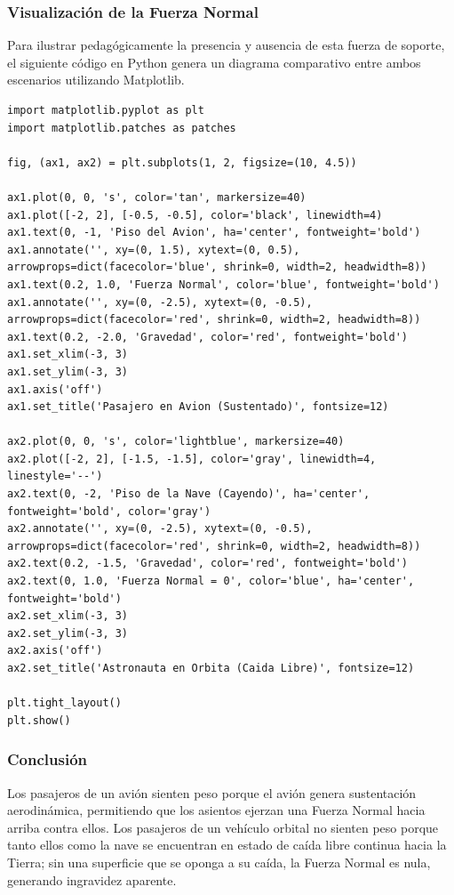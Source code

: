 \documentclass[12pt]{article}
\begin{document}
\subsubsection*{Visualización de la Fuerza Normal}
Para ilustrar pedagógicamente la presencia y ausencia de esta fuerza de soporte, el siguiente código en Python genera un diagrama comparativo entre ambos escenarios utilizando Matplotlib.

\begin{lstlisting}
import matplotlib.pyplot as plt
import matplotlib.patches as patches

fig, (ax1, ax2) = plt.subplots(1, 2, figsize=(10, 4.5))

ax1.plot(0, 0, 's', color='tan', markersize=40)
ax1.plot([-2, 2], [-0.5, -0.5], color='black', linewidth=4) 
ax1.text(0, -1, 'Piso del Avion', ha='center', fontweight='bold')
ax1.annotate('', xy=(0, 1.5), xytext=(0, 0.5), arrowprops=dict(facecolor='blue', shrink=0, width=2, headwidth=8))
ax1.text(0.2, 1.0, 'Fuerza Normal', color='blue', fontweight='bold')
ax1.annotate('', xy=(0, -2.5), xytext=(0, -0.5), arrowprops=dict(facecolor='red', shrink=0, width=2, headwidth=8))
ax1.text(0.2, -2.0, 'Gravedad', color='red', fontweight='bold')
ax1.set_xlim(-3, 3)
ax1.set_ylim(-3, 3)
ax1.axis('off')
ax1.set_title('Pasajero en Avion (Sustentado)', fontsize=12)

ax2.plot(0, 0, 's', color='lightblue', markersize=40)
ax2.plot([-2, 2], [-1.5, -1.5], color='gray', linewidth=4, linestyle='--') 
ax2.text(0, -2, 'Piso de la Nave (Cayendo)', ha='center', fontweight='bold', color='gray')
ax2.annotate('', xy=(0, -2.5), xytext=(0, -0.5), arrowprops=dict(facecolor='red', shrink=0, width=2, headwidth=8))
ax2.text(0.2, -1.5, 'Gravedad', color='red', fontweight='bold')
ax2.text(0, 1.0, 'Fuerza Normal = 0', color='blue', ha='center', fontweight='bold')
ax2.set_xlim(-3, 3)
ax2.set_ylim(-3, 3)
ax2.axis('off')
ax2.set_title('Astronauta en Orbita (Caida Libre)', fontsize=12)

plt.tight_layout()
plt.show()
\end{lstlisting}

\subsubsection*{Conclusión}
Los pasajeros de un avión sienten peso porque el avión genera sustentación aerodinámica, permitiendo que los asientos ejerzan una Fuerza Normal hacia arriba contra ellos. Los pasajeros de un vehículo orbital no sienten peso porque tanto ellos como la nave se encuentran en estado de caída libre continua hacia la Tierra; sin una superficie que se oponga a su caída, la Fuerza Normal es nula, generando ingravidez aparente.
\end{document}
